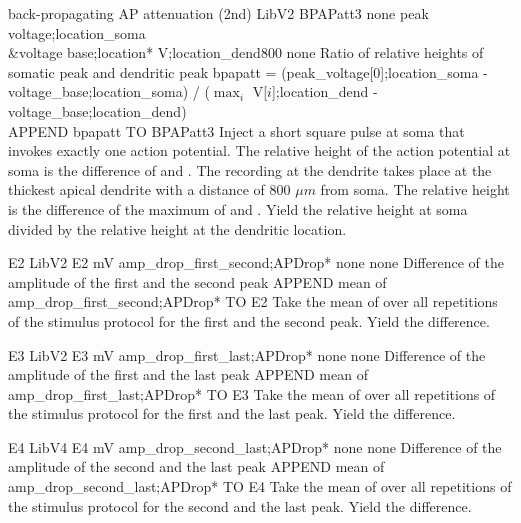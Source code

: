 \begin{efeature}
  {back-propagating AP attenuation (2nd)}
  {LibV2}
  {BPAPatt3}
  {none}
  {peak voltage;location\_soma\\&voltage base;location*}
  {V;location\_dend800}
  {none}
  {Ratio of relative heights of somatic peak and dendritic peak}
  {
  bpapatt = (peak\_voltage[0];location\_soma - voltage\_base;location\_soma) / ($\max_i$ V[$i$];location\_dend - voltage\_base;location\_dend) \\
  APPEND bpapatt TO BPAPatt3
  }
  Inject a short square pulse at soma that invokes exactly one action potential.
  The relative height of the action potential at soma is the difference of  and .
  The recording at the dendrite takes place at the thickest apical dendrite with a distance of 800 $\mu m$ from soma.
  The relative height is the difference of the maximum of  and .
  Yield the relative height at soma divided by the relative height at the dendritic location.
  
\end{efeature}

\begin{efeature}
  {E2}
  {LibV2}
  {E2}
  {mV}
  {amp\_drop\_first\_second;APDrop*}
  {none}
  {none}
  {Difference of the amplitude of the first and the second peak}
  {
  APPEND mean of amp\_drop\_first\_second;APDrop* TO E2
  }
  Take the mean of  over all repetitions of the stimulus protocol  for the first and the second peak.
  Yield the difference.
  
\end{efeature}

\begin{efeature}
  {E3}
  {LibV2}
  {E3}
  {mV}
  {amp\_drop\_first\_last;APDrop*}
  {none}
  {none}
  {Difference of the amplitude of the first and the last peak}
  {
  APPEND mean of amp\_drop\_first\_last;APDrop* TO E3
  }
  Take the mean of  over all repetitions of the stimulus protocol  for the first and the last peak.
  Yield the difference.
  
\end{efeature}

\begin{efeature}
  {E4}
  {LibV4}
  {E4}
  {mV}
  {amp\_drop\_second\_last;APDrop*}
  {none}
  {none}
  {Difference of the amplitude of the second and the last peak}
  {
  APPEND mean of amp\_drop\_second\_last;APDrop* TO E4
  }
  Take the mean of  over all repetitions of the stimulus protocol  for the second and the last peak.
  Yield the difference.

\end{efeature}

